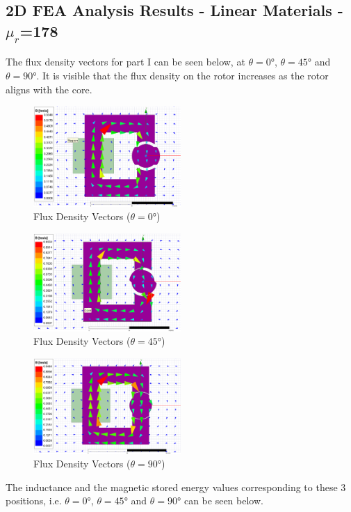 \documentclass[a4paper, 11pt]{article}
\begin{document}
\subsection{2D FEA Analysis Results - Linear Materials - $\mu_r$=178}
The flux density vectors for part I can be seen below, at $\theta=\ang{0}$, $\theta=\ang{45}$ and $\theta=\ang{90}$. It is visible that the flux density on the rotor increases as the rotor aligns with the core.

\begin{figure}[h!]
\centering
\includegraphics[width=0.5\textwidth]{Q2a-0.png}
\caption{Flux Density Vectors ($\theta=\ang{0}$)}
\end{figure}
\begin{figure}[h!]
\centering
\includegraphics[width=0.5\textwidth]{Q2a-45.png}
\caption{Flux Density Vectors ($\theta=\ang{45}$)}
\end{figure}
\begin{figure}[h!]
\centering
\includegraphics[width=0.5\textwidth]{Q2a-90.png}
\caption{Flux Density Vectors ($\theta=\ang{90}$)}
\end{figure}

The inductance and the magnetic stored energy values corresponding to these 3 positions, i.e. $\theta=\ang{0}$, $\theta=\ang{45}$ and $\theta=\ang{90}$ can be seen below.
\end{document}
